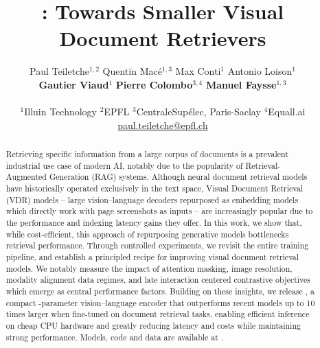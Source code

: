 \documentclass{article} %
\title{\flagship{}: Towards Smaller Visual Document Retrievers}
\author{Paul Teiletche$^{1,2}$
\quad Quentin Macé$^{1,3}$ 
\quad Max Conti$^{1}$ 
\quad Antonio Loison$^{1}$ 
\\
\textbf{Gautier Viaud}$^{1}$ 
\quad \textbf{Pierre Colombo}$^{3,4}$
\quad \textbf{Manuel Faysse}$^{1,3}$
\\\\
$^{1}$Illuin Technology 
\quad$^2$EPFL
\quad$^3$CentraleSupélec, Paris-Saclay 
\quad $^4$Equall.ai 
\\
\small \url{paul.teiletche@epfl.ch}}
\renewcommand{\textcolor}[2]{#2}
\begin{document}
\maketitle

\begin{abstract}
    \textcolor{red}{Retrieving specific information from a large corpus of documents is a prevalent industrial use case of modern AI, notably due to the popularity of Retrieval-Augmented Generation (RAG) systems. Although neural document retrieval models have historically operated exclusively in the text space, Visual Document Retrieval (VDR) models -- large vision–language decoders repurposed as embedding models which directly work with page screenshots as inputs -- are increasingly popular due to the performance and indexing latency gains they offer.
    In this work, we show that, while cost-efficient, this approach of repurposing generative models bottlenecks retrieval performance.}
    Through controlled experiments, we \textcolor{red}{revisit the entire training pipeline, and} establish a principled recipe for improving visual document retrieval models. We notably measure the impact of attention masking, image resolution, modality alignment data regimes, and late interaction centered contrastive objectives which emerge as central performance factors.
   Building on these insights, we release \flagship{}, a compact \flagshipparameters{}-parameter vision–language encoder that outperforms recent models up to 10 times larger when fine-tuned on document retrieval tasks, \textcolor{red}{enabling efficient inference on cheap CPU hardware and greatly reducing latency and costs while maintaining strong performance. 
   Models, code and data are available at \repo.
}
\end{abstract}


\end{document}
